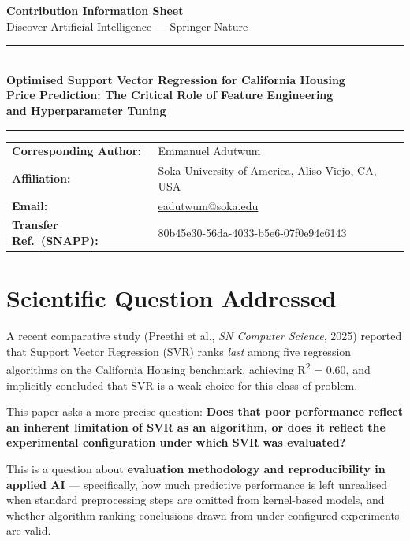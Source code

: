 \documentclass[12pt,a4paper]{article}
\begin{document}
\begin{center}
  {\LARGE\bfseries\color{springerblue} Contribution Information Sheet}\\[6pt]
  {\large Discover Artificial Intelligence --- Springer Nature}\\[18pt]
  \rule{\linewidth}{1pt}\\[10pt]
  {\large\bfseries Optimised Support Vector Regression for California Housing\\
  Price Prediction: The Critical Role of Feature Engineering\\
  and Hyperparameter Tuning}\\[10pt]
  \rule{\linewidth}{0.4pt}
\end{center}

\vspace{6pt}

\begin{tabular}{@{}ll@{}}
\textbf{Corresponding Author:}  & Emmanuel Adutwum \\
\textbf{Affiliation:}           & Soka University of America, Aliso Viejo, CA, USA \\
\textbf{Email:}                 & \href{mailto:eadutwum@soka.edu}{eadutwum@soka.edu} \\
\textbf{Transfer Ref.\ (SNAPP):}& 80b45e30-56da-4033-b5e6-07f0e94c6143 \\
\end{tabular}

\vspace{14pt}

\section{Scientific Question Addressed}

A recent comparative study (Preethi et al., \textit{SN Computer Science}, 2025) reported
that Support Vector Regression (SVR) ranks \emph{last} among five regression algorithms on
the California Housing benchmark, achieving R\textsuperscript{2} = 0.60, and implicitly
concluded that SVR is a weak choice for this class of problem.

This paper asks a more precise question: \textbf{Does that poor performance reflect an
inherent limitation of SVR as an algorithm, or does it reflect the experimental
configuration under which SVR was evaluated?}

This is a question about \textbf{evaluation methodology and reproducibility in applied AI}
--- specifically, how much predictive performance is left unrealised when standard
preprocessing steps are omitted from kernel-based models, and whether algorithm-ranking
conclusions drawn from under-configured experiments are valid.
\end{document}
